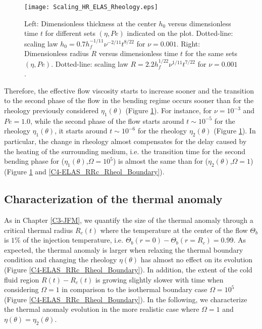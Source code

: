 \begin{figure}[htpb]
  \begin{center}
    \graphicspath{ {/Users/thorey/Documents/These/Projet/Refroidissement/Skin_Model/Figure/Figure_Heating/} }
    \texttt{[image: Scaling\_HR\_ELAS\_Rheology.eps]}
    \caption{Left: Dimensionless thickness at  the center $h_0$ versus
      dimensionless time $t$ for  different sets $(\eta,Pe)$ indicated
      on      the      plot.        Dotted-line:      scaling      law
      $h_0=  0.7h_f^{-1/11}\nu^{-2/11}t^{8/22}$  for  $\nu  =  0.001$.
      Right: Dimensionless  radius $R$  versus dimensionless  time $t$
      for  the  same  sets   $(\eta,Pe)$.   Dotted-line:  scaling  law
      $R= 2.2h_f^{1/22}\nu^{1/11}t^{7/22}$ for $\nu=0.001$.}
    \label{C4-Scaling_HR_ELAS_Rheology}
  \end{center}
\end{figure}

Therefore, the effective flow viscosity  starts to increase sooner and
the transition to  the second phase of the flow  in the bending regime
occurs   sooner   than   for  the   rheology   previously   considered
$\eta_1(\theta)$   (Figure  \ref{C4-Scaling_HR_ELAS_Rheology}).    For
instance, for  $\nu=10^{-3}$ and $Pe=1.0$,  while the second  phase of
the   flow   starts   around   $t\sim  10^{-5}$   for   the   rheology
$\eta_1(\theta)$, it  starts around  $t\sim 10^{-6}$ for  the rheology
$\eta_2(\theta)$   (Figure   \ref{C4-Scaling_HR_ELAS_Rheology}).    In
particular, the  change in rheology  almost compensates for  the delay
caused by the heating of  the surrounding medium, i.e.  the transition
time for the second bending phase for ($\eta_1(\theta)$,$\Omega=10^5$)
is  almost the  same  than  for ($\eta_2(\theta)$,$\Omega=1$)  (Figure
\ref{C4-Scaling_HR_ELAS_Rheology}                                  and
\ref{C4-ELAS_RRc_Rheol_Boundary}).

\subsection{Characterization of the thermal anomaly}
\label{C4-sec:char-therm-anom}

As  in Chapter  \ref{C3-JFM},  we  quantify the  size  of the  thermal
anomaly  through   a  critical  thermal  radius   $R_c(t)$  where  the
temperature  at the  center of  the flow  $\Theta_b$ is  $1\%$ of  the
injection temperature,  i.e.  $\Theta_b(r=0)-\Theta_b(r=R_c)=0.99$. As
expected,  the thermal  anomaly is  larger when  relaxing the  thermal
boundary condition and changing the rheology $\eta(\theta)$ has almost
no        effect        on         its        evolution        (Figure
\ref{C4-ELAS_RRc_Rheol_Boundary}). In addition, the extent of the cold
fluid region $R(t)-R_c(t)$  is growing slightly slower  with time when
considering $\Omega=1$  in comparison to the  isothermal boundary case
$\Omega=10^5$   (Figure  \ref{C4-ELAS_RRc_Rheol_Boundary}).    In  the
following, we characterize  the thermal anomaly evolution  in the more
realistic case where $\Omega=1$ and $\eta(\theta)=\eta_2(\theta)$.

